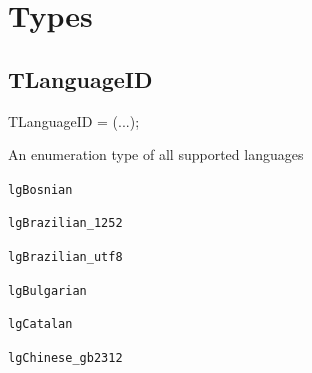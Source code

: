\documentclass{report}
\newif\ifpdf
\begin{document}
\section{Types}
\ifpdf
\subsection*{\large{\textbf{TLanguageID}}\normalsize\hspace{1ex}\hrulefill}
\else
\subsection*{TLanguageID}
\fi
\label{PasDoc_Languages-TLanguageID}
\begin{list}{}{
\setlength{\itemindent}{0cm}
\setlength{\listparindent}{0cm}
\setlength{\leftmargin}{\evensidemargin}
\addtolength{\leftmargin}{\tmplength}
\settowidth{\labelsep}{X}
\addtolength{\leftmargin}{\labelsep}
\setlength{\labelwidth}{\tmplength}
}
\item[\textbf{Declaration}\hfill]
\ifpdf
\begin{flushleft}
\fi
\begin{ttfamily}
TLanguageID = (...);\end{ttfamily}

\ifpdf
\end{flushleft}
\fi

\par
\item[\textbf{Description}]
An enumeration type of all supported languages\item[\textbf{Values}]
\begin{description}
\item[\texttt{lgBosnian}] \label{PasDoc_Languages-lgBosnian}
\index{}
 
\item[\texttt{lgBrazilian{\_}1252}] \label{PasDoc_Languages-lgBrazilian_1252}
\index{}
 
\item[\texttt{lgBrazilian{\_}utf8}] \label{PasDoc_Languages-lgBrazilian_utf8}
\index{}
 
\item[\texttt{lgBulgarian}] \label{PasDoc_Languages-lgBulgarian}
\index{}
 
\item[\texttt{lgCatalan}] \label{PasDoc_Languages-lgCatalan}
\index{}
 
\item[\texttt{lgChinese{\_}gb2312}] \label{PasDoc_Languages-lgChinese_gb2312}
\index{}
 

\end{description}
\end{list}
\end{document}
